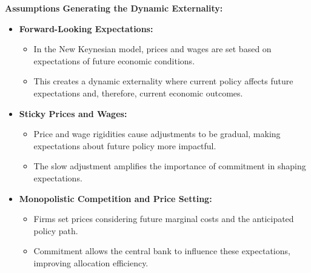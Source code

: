 \begin{solution}
    
    \textbf{Assumptions Generating the Dynamic Externality:}
    \begin{itemize}
        \item \textbf{Forward-Looking Expectations:}
        \begin{itemize}
            \item In the New Keynesian model, prices and wages are set based on expectations of future economic conditions.
            \item This creates a dynamic externality where current policy affects future expectations and, therefore, current economic outcomes.
        \end{itemize}
        
        \item \textbf{Sticky Prices and Wages:}
        \begin{itemize}
            \item Price and wage rigidities cause adjustments to be gradual, making expectations about future policy more impactful.
            \item The slow adjustment amplifies the importance of commitment in shaping expectations.
        \end{itemize}
        
        \item \textbf{Monopolistic Competition and Price Setting:}
        \begin{itemize}
            \item Firms set prices considering future marginal costs and the anticipated policy path.
            \item Commitment allows the central bank to influence these expectations, improving allocation efficiency.
        \end{itemize}
    \end{itemize}
\end{solution}